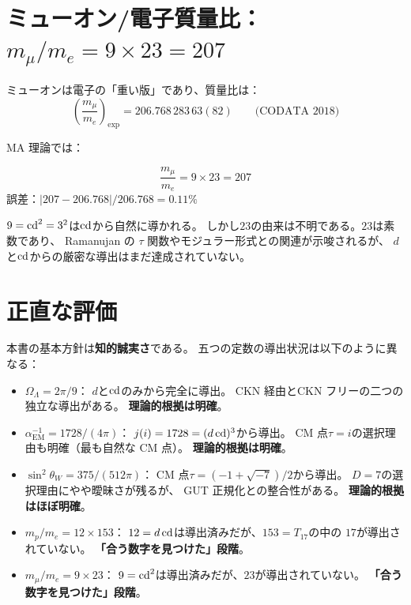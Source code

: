 \section{ミューオン/電子質量比：$m_\mu/m_e = 9 \times 23 = 207$}
\label{sec:muon-electron}

ミューオンは電子の「重い版」であり、質量比は：
\begin{equation}
\left(\frac{m_\mu}{m_e}\right)_{\!\text{exp}} = 206.768\,283\,63(82)
\qquad\text{(CODATA 2018)}
\end{equation}

MA 理論では：
\begin{keyresult}
\begin{equation}
\frac{m_\mu}{m_e} = 9 \times 23 = 207
\end{equation}
誤差：$|207 - 206.768| / 206.768 = 0.11\%$
\end{keyresult}

$9 = \operatorname{cd}^2 = 3^2$は$\operatorname{cd}$から自然に導かれる。
しかし$23$の由来は不明である。$23$は素数であり、
Ramanujan の $\tau$ 関数やモジュラー形式との関連が示唆されるが、
$d$と$\operatorname{cd}$からの厳密な導出はまだ達成されていない。

\section{正直な評価}
\label{sec:honest-assessment}

本書の基本方針は\textbf{知的誠実さ}である。
五つの定数の導出状況は以下のように異なる：

\begin{itemize}
\item \textbf{$\Omega_\Lambda = 2\pi/9$}：
  $d$と$\operatorname{cd}$のみから完全に導出。
  CKN 経由とCKN フリーの二つの独立な導出がある。
  \textbf{理論的根拠は明確}。

\item \textbf{$\alpha_{\mathrm{EM}}^{-1} = 1728/(4\pi)$}：
  $j(i) = 1728 = (d\operatorname{cd})^3$から導出。
  CM 点$\tau = i$の選択理由も明確（最も自然な CM 点）。
  \textbf{理論的根拠は明確}。

\item \textbf{$\sin^2\theta_W = 375/(512\pi)$}：
  CM 点$\tau = (-1+\sqrt{-7})/2$から導出。
  $D=7$の選択理由にやや曖昧さが残るが、
  GUT 正規化との整合性がある。
  \textbf{理論的根拠はほぼ明確}。

\item \textbf{$m_p/m_e = 12 \times 153$}：
  $12 = d\operatorname{cd}$は導出済みだが、$153 = T_{17}$の中の
  $17$が導出されていない。
  \textbf{「合う数字を見つけた」段階}。

\item \textbf{$m_\mu/m_e = 9 \times 23$}：
  $9 = \operatorname{cd}^2$は導出済みだが、$23$が導出されていない。
  \textbf{「合う数字を見つけた」段階}。
\end{itemize}

